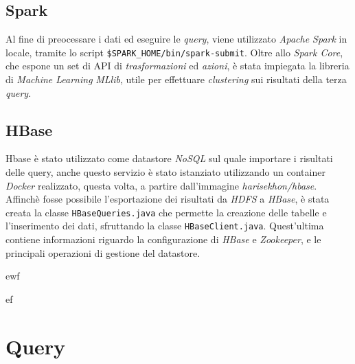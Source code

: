 \documentclass[conference]{IEEEtran}
\begin{document}
\subsection*{\textbf{Spark}}
Al fine di preocessare i dati ed eseguire le \emph{query}, viene utilizzato \emph{Apache Spark} in locale, tramite lo script \texttt{\$SPARK\_HOME/bin/spark-submit}. Oltre allo \emph{Spark Core}, che espone un set di API di \emph{trasformazioni} ed \emph{azioni}, \`{e} stata impiegata la libreria di \emph{Machine Learning} \emph{MLlib}, utile per effettuare \emph{clustering} sui risultati della terza \emph{query}. 

\subsection*{\textbf{HBase}}
Hbase \`{e} stato utilizzato come datastore \emph{NoSQL} sul quale
importare i risultati delle ​query,​ anche questo servizio \`{e}
stato istanziato utilizzando un ​container \emph{Docker} realizzato,
questa volta, a partire dall'immagine​ \emph{harisekhon/hbase}​. Affinch\`{e} fosse possibile
l'esportazione dei risultati da \emph{HDFS} a \emph{HBase}, \`{e} stata creata la classe \texttt{HBaseQueries.java} che permette la creazione delle tabelle e l'inserimento dei dati, sfruttando la classe \texttt{HBaseClient.java}. Quest'ultima contiene informazioni riguardo la configurazione di \emph{HBase} e \emph{Zookeeper}, e le principali operazioni di gestione del datastore.\\\begin{list}{0}{\textbf{Lista:}}
\item  ewf
\item ef
\end{list}
\section{\textbf{Query}}
\end{document}
